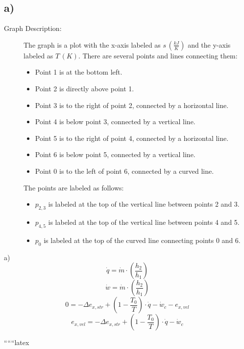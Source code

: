 

\subsection*{a)}

\begin{description}
    \item[Graph Description:] The graph is a plot with the x-axis labeled as $s \, (\frac{kJ}{K})$ and the y-axis labeled as $T \, (K)$. There are several points and lines connecting them:
    \begin{itemize}
        \item Point 1 is at the bottom left.
        \item Point 2 is directly above point 1.
        \item Point 3 is to the right of point 2, connected by a horizontal line.
        \item Point 4 is below point 3, connected by a vertical line.
        \item Point 5 is to the right of point 4, connected by a horizontal line.
        \item Point 6 is below point 5, connected by a vertical line.
        \item Point 0 is to the left of point 6, connected by a curved line.
    \end{itemize}
    The points are labeled as follows:
    \begin{itemize}
        \item $p_{2,3}$ is labeled at the top of the vertical line between points 2 and 3.
        \item $p_{4,5}$ is labeled at the top of the vertical line between points 4 and 5.
        \item $p_0$ is labeled at the top of the curved line connecting points 0 and 6.
    \end{itemize}
\end{description}

a) \\
\[
\dot{q} = \dot{m} \cdot \left( \frac{h_2}{h_1} \right)
\]
\[
\dot{w} = \dot{m} \cdot \left( \frac{h_2}{h_1} \right)
\]
\[
0 = -\Delta e_{x,str} + \left( 1 - \frac{T_0}{T} \right) \cdot \dot{q} - \dot{w}_c - e_{x,vel}
\]
\[
e_{x,vel} = -\Delta e_{x,str} + \left( 1 - \frac{T_0}{T} \right) \cdot \dot{q} - \dot{w}_c
\]

``````latex